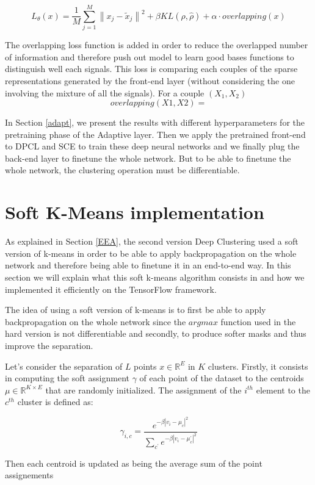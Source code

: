 \documentclass[master, tikz, final,11pt, dvipdfmx]{iscs-thesis}
\newcommand{\norm}[1]{\left\lVert#1\right\rVert}
\begin{document}
\[L_\theta(x) = \frac{1}{M}\sum_{j=1}^{M}{\norm{x_j - \tilde{x}_j}}^2 + \beta KL(\rho, \hat{\rho}) + \alpha \cdot overlapping(x)\]

The overlapping loss function is added in order to reduce the overlapped number of information and therefore push out model to learn good bases functions to distinguish well each signals. This loss is comparing each couples of the sparse representations generated by the front-end layer (without considering the one involving the mixture of all the signals). For a couple $(X_1,X_2)$
\[overlapping(X1, X2) = \] 

In Section \ref{adapt}, we present the results with different hyperparameters for the pretraining phase of the Adaptive layer. Then we apply the pretrained front-end to DPCL and SCE to train these deep neural networks and we finally plug the back-end layer to finetune the whole network. But to be able to finetune the whole network, the clustering operation must be differentiable.

\section{Soft K-Means implementation}

As explained in Section \ref{EEA}, the second version Deep Clustering used a soft version of k-means in order to be able to apply backpropagation on the whole network and therefore being able to finetune it in an end-to-end way. In this section we will explain what this soft k-means algorithm consists in and how we implemented it efficiently on the TensorFlow framework.

The idea of using a soft version of k-means is to first be able to apply backpropagation on the whole network since the $argmax$ function used in the hard version is not differentiable and secondly, to produce softer masks and thus improve the separation. 

Let's consider the separation of $L$ points $x \in \mathbb{R}^E$ in $K$ clusters. Firstly, it consists in computing the soft assignment $\gamma$ of each point of the dataset to the centroids $\mu \in \mathbb{R}^{K\times E}$ that are randomly initialized. The assignment of the $i^{th}$ element to the $c^{th}$ cluster is defined as:

\[ \gamma_{i,c} = \frac{e^{-\beta |v_i-\mu_c|^2}}{\sum_{c^\prime} e^{-\beta |v_i-\mu_c^\prime|^2}}  \]

Then each centroid is updated as being the average sum of the point assignements
\end{document}
